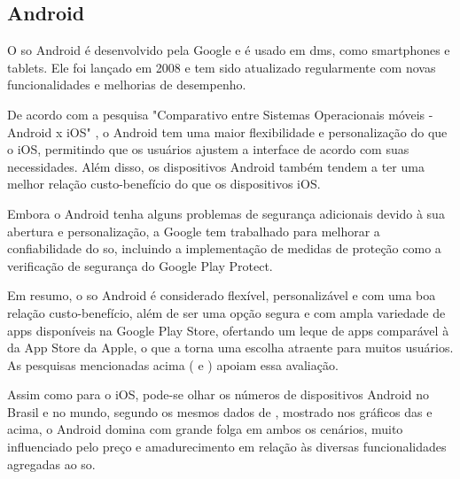 
\subsection{Android}\label{ssec:android}
O \ac{so} Android é desenvolvido pela Google e é usado em \acp{dm}, como smartphones e tablets. Ele foi lançado em 2008 e tem sido atualizado regularmente com novas funcionalidades e melhorias de desempenho.

De acordo com a pesquisa "Comparativo entre Sistemas Operacionais móveis - Android x iOS" \citet{leite2017comparativo}, o Android tem uma maior flexibilidade e personalização do que o iOS, permitindo que os usuários ajustem a interface de acordo com suas necessidades. Além disso, os dispositivos Android também tendem a ter uma melhor relação custo-benefício do que os dispositivos iOS.

Embora o Android tenha alguns problemas de segurança adicionais devido à sua abertura e personalização, a Google tem trabalhado para melhorar a confiabilidade do \ac{so}, incluindo a implementação de medidas de proteção como a verificação de segurança do Google Play Protect.

Em resumo, o \ac{so} Android é considerado flexível, personalizável e com uma boa relação custo-benefício, além de ser uma opção segura e com ampla variedade de \acp{app} disponíveis na Google Play Store, ofertando um leque de \acp{app} comparável à da App Store da Apple, o que a torna uma escolha atraente para muitos usuários. As pesquisas mencionadas acima (\citet{leite2017comparativo} e \citet{borges2017analise}) apoiam essa avaliação.

Assim como para o iOS, pode-se olhar os números de dispositivos Android no Brasil e no mundo, segundo os mesmos dados de \cite{stats2020mobile}, mostrado nos gráficos das  e  acima, o Android domina com grande folga em ambos os cenários, muito influenciado pelo preço e amadurecimento em relação às diversas funcionalidades agregadas ao \ac{so}.

